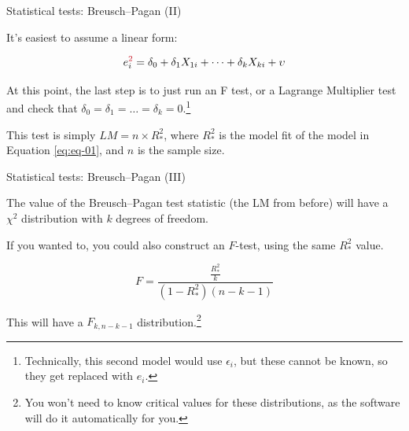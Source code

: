 \documentclass[12pt,english,pdf,xcolor=dvipsnames,aspectratio=169,handout]{beamer}\usepackage[]{graphicx}\usepackage[]{xcolor}
\begin{document}
\begin{frame}{Statistical tests: Breusch--Pagan (II)}

It's easiest to assume a linear form:

\begin{equation}
e_i^{\textcolor{title}{2}} = \delta_0 + \delta_1X_{1i} + \dots + \delta_kX_{ki} + \upsilon
\label{eq:eq-01}
\end{equation}

At this point, the last step is to just run an F test, or a Lagrange Multiplier test and check that $\delta_0=\delta_1=\dots=\delta_k=0$.\footnote{Technically, this second model would use $\epsilon_i$, but these cannot be known, so they get replaced with $e_i$.}\bigskip

This test is simply $LM=n \times R_*^2$, where $R_*^2$ is the model fit of the model in Equation \ref{eq:eq-01}, and $n$ is the sample size.

\end{frame}


\begin{frame}{Statistical tests: Breusch--Pagan (III)}

The value of the Breusch--Pagan test statistic (the LM from before) will have a $\chi^2$ distribution with $k$ degrees of freedom.\bigskip

If you wanted to, you could also construct an $F$-test, using the same $R_*^2$ value.

\begin{equation}
F = \frac{\frac{R_*^2}{k}}{(1-R_*^2)(n-k-1)}
\end{equation}

This will have a $F_{k, n-k-1}$ distribution.\footnote{You won't need to know critical values for these distributions, as the software will do it automatically for you.}

\end{frame}
\end{document}
